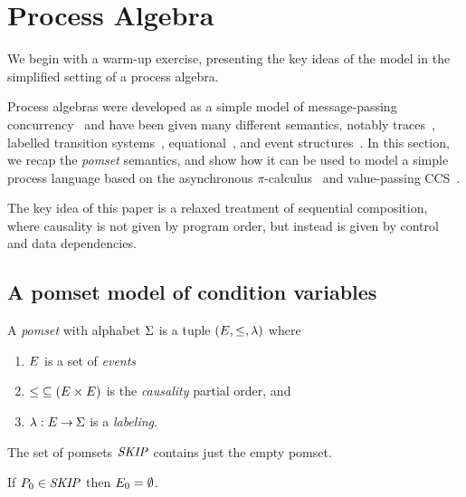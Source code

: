\section{Process Algebra}

We begin with a warm-up exercise, presenting the key ideas of the
model in the simplified setting of a process algebra.

Process algebras were developed as a simple model of message-passing
concurrency~\cite{CCS,CSP,ACP} and have been given many different
semantics, notably traces~\cite{???}, labelled transition
systems~\cite{???}, equational~\cite{???}, and event
structures~\cite{???}.  In this section, we recap the \emph{pomset}
semantics, and show how it can be used to model a simple process
language based on the asynchronous $\pi$-calculus~\cite{???} and
value-passing CCS~\cite{???}.

The key idea of this paper is a relaxed treatment of sequential
composition, where causality is not given by program order, but
instead is given by control and data dependencies.

\subsection{A pomset model of condition variables}

\begin{definition}
  A \emph{pomset} with alphabet $\Sigma$ is a tuple
  $(E, {\le}, \lambda)$ where
  \begin{enumerate}
  \item $E$ is a set of \emph{events}
  \item
    ${\le} \subseteq (E\times E)$ is the \emph{causality} partial order, and
  \item
    $\lambda: E \mathbin\rightarrow \Sigma$ is a \emph{labeling}.
  \end{enumerate}
\end{definition}

The set of pomsets $\mathit{SKIP}$ contains just the empty pomset.

\begin{definition}
  If $P_0\in\mathit{SKIP}$ then
  $E_0 = \emptyset$.
\end{definition}

